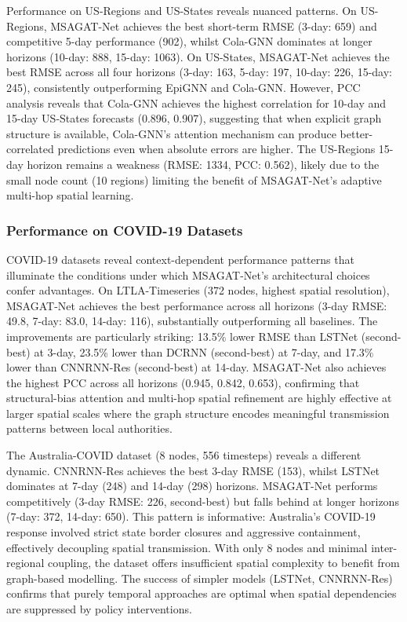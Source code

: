 \documentclass[a4paper,fleqn]{cas-dc}
\begin{document}
Performance on US-Regions and US-States reveals nuanced patterns. On US-Regions, MSAGAT-Net achieves the best short-term RMSE (3-day: 659) and competitive 5-day performance (902), whilst Cola-GNN dominates at longer horizons (10-day: 888, 15-day: 1063). On US-States, MSAGAT-Net achieves the best RMSE across all four horizons (3-day: 163, 5-day: 197, 10-day: 226, 15-day: 245), consistently outperforming EpiGNN and Cola-GNN. However, PCC analysis reveals that Cola-GNN achieves the highest correlation for 10-day and 15-day US-States forecasts (0.896, 0.907), suggesting that when explicit graph structure is available, Cola-GNN's attention mechanism can produce better-correlated predictions even when absolute errors are higher. The US-Regions 15-day horizon remains a weakness (RMSE: 1334, PCC: 0.562), likely due to the small node count (10 regions) limiting the benefit of MSAGAT-Net's adaptive multi-hop spatial learning.

\subsubsection{Performance on COVID-19 Datasets}

COVID-19 datasets reveal context-dependent performance patterns that illuminate the conditions under which MSAGAT-Net's architectural choices confer advantages. On LTLA-Timeseries (372 nodes, highest spatial resolution), MSAGAT-Net achieves the best performance across all horizons (3-day RMSE: 49.8, 7-day: 83.0, 14-day: 116), substantially outperforming all baselines. The improvements are particularly striking: 13.5\% lower RMSE than LSTNet (second-best) at 3-day, 23.5\% lower than DCRNN (second-best) at 7-day, and 17.3\% lower than CNNRNN-Res (second-best) at 14-day. MSAGAT-Net also achieves the highest PCC across all horizons (0.945, 0.842, 0.653), confirming that structural-bias attention and multi-hop spatial refinement are highly effective at larger spatial scales where the graph structure encodes meaningful transmission patterns between local authorities.

The Australia-COVID dataset (8 nodes, 556 timesteps) reveals a different dynamic. CNNRNN-Res achieves the best 3-day RMSE (153), whilst LSTNet dominates at 7-day (248) and 14-day (298) horizons. MSAGAT-Net performs competitively (3-day RMSE: 226, second-best) but falls behind at longer horizons (7-day: 372, 14-day: 650). This pattern is informative: Australia's COVID-19 response involved strict state border closures and aggressive containment, effectively decoupling spatial transmission. With only 8 nodes and minimal inter-regional coupling, the dataset offers insufficient spatial complexity to benefit from graph-based modelling. The success of simpler models (LSTNet, CNNRNN-Res) confirms that purely temporal approaches are optimal when spatial dependencies are suppressed by policy interventions.
\end{document}
